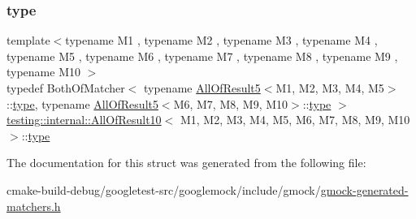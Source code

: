 \subsubsection{\texorpdfstring{type}{type}}
{\footnotesize\ttfamily template$<$typename M1 , typename M2 , typename M3 , typename M4 , typename M5 , typename M6 , typename M7 , typename M8 , typename M9 , typename M10 $>$ \\
typedef Both\+Of\+Matcher$<$ typename \mbox{\hyperlink{structtesting_1_1internal_1_1AllOfResult5}{All\+Of\+Result5}}$<$M1, M2, M3, M4, M5$>$\+::\mbox{\hyperlink{structtesting_1_1internal_1_1AllOfResult10_a48d6c6de6d0d5445b212119e1f536af5}{type}}, typename \mbox{\hyperlink{structtesting_1_1internal_1_1AllOfResult5}{All\+Of\+Result5}}$<$M6, M7, M8, M9, M10$>$\+::\mbox{\hyperlink{structtesting_1_1internal_1_1AllOfResult10_a48d6c6de6d0d5445b212119e1f536af5}{type}} $>$ \mbox{\hyperlink{structtesting_1_1internal_1_1AllOfResult10}{testing\+::internal\+::\+All\+Of\+Result10}}$<$ M1, M2, M3, M4, M5, M6, M7, M8, M9, M10 $>$\+::\mbox{\hyperlink{structtesting_1_1internal_1_1AllOfResult10_a48d6c6de6d0d5445b212119e1f536af5}{type}}}



The documentation for this struct was generated from the following file\+:\begin{DoxyCompactItemize}
\item 
cmake-\/build-\/debug/googletest-\/src/googlemock/include/gmock/\mbox{\hyperlink{gmock-generated-matchers_8h}{gmock-\/generated-\/matchers.\+h}}\end{DoxyCompactItemize}

